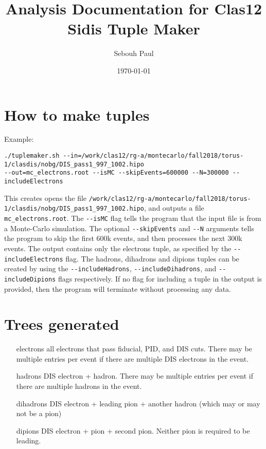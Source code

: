 \documentclass[english]{article}
\newcommand{\code}[1]{\texttt{#1}}
\begin{document}
\title{
Analysis Documentation for Clas12 Sidis Tuple Maker
}

\author{Sebouh Paul}
\date{\today}

\maketitle
\tableofcontents
\newpage

\section{How to make tuples}
Example:\\
\begin{verbatim}
./tuplemaker.sh --in=/work/clas12/rg-a/montecarlo/fall2018/torus-1/clasdis/nobg/DIS_pass1_997_1002.hipo
--out=mc_electrons.root --isMC --skipEvents=600000 --N=300000 --includeElectrons
 \end{verbatim}

This creates opens the file \code{/work/clas12/rg-a/montecarlo/fall2018/torus-1/clasdis/nobg/DIS\_pass1\_997\_1002.hipo}, and outputs a file \code{mc\_electrons.root}.  The \code{-{}-isMC} flag tells the program that the input file is from a Monte-Carlo simulation.  The optional \code{-{}-skipEvents} and \code{-{}-N} arguments tells the program to skip the first 600k events, and then processes the next 300k events.  The output contains only the electrons tuple, as specified by the \code{-{}-includeElectrons} flag.  The hadrons, dihadrons and dipions tuples can be created by using the \code{-{}-includeHadrons}, \code{-{}-includeDihadrons}, and \code{-{}-includeDipions} flags respectively.  If no flag for including a tuple in the output is provided, then the program will terminate without processing any data.  
 

\section{Trees generated}
\begin{itemize}
\item[electrons] all electrons that pass fiducial, PID, and DIS cuts.  There may be multiple entries per event if there are multiple DIS electrons in the event.
\item[hadrons] DIS electron + hadron.  There may be multiple entries per event if there are multiple hadrons in the event.  
\item[dihadrons] DIS electron + leading pion + another hadron (which may or may not be a pion)
\item[dipions] DIS electron + pion + second pion.  Neither pion is required to be leading.  
\end{itemize}
\end{document}
